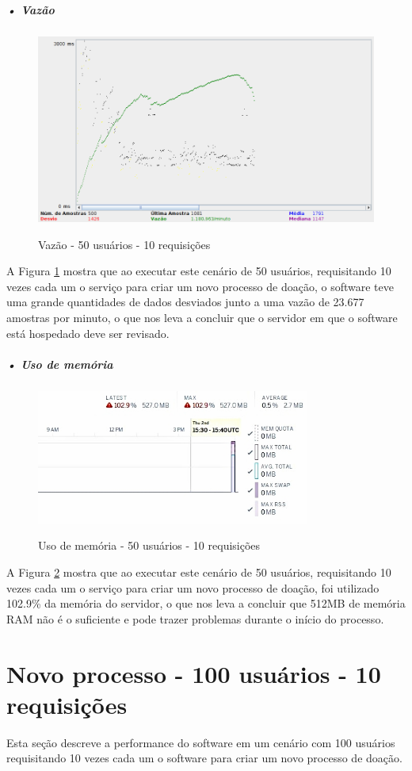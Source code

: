 \documentclass[portuguese,oneside]{tcc}
\begin{document}
\subparagraph{• Vazão}
\begin{figure}[htp]
\centering
\caption{Vazão - 50 usuários - 10 requisições}
\includegraphics[width=15cm]{50-10-throughput}
\label{fig:throughput-50-10}
\end{figure}

A Figura \ref{fig:throughput-50-10} mostra que ao executar este cenário de 50 usuários, requisitando 10 vezes cada um o serviço para criar um novo processo de doação, o software teve uma grande quantidades de dados desviados junto a uma vazão de 23.677 amostras por minuto, o que nos leva a concluir que o servidor em que o software está hospedado deve ser revisado.

\subparagraph{• Uso de memória}
\begin{figure}[htp]
\centering
\caption{Uso de memória - 50 usuários - 10 requisições}
\includegraphics[width=9cm]{50-10-memory}
\label{fig:uso-de-memoria-50-10}
\end{figure}

A Figura \ref{fig:uso-de-memoria-50-10} mostra que ao executar este cenário de 50 usuários, requisitando 10 vezes cada um o serviço para criar um novo processo de doação, foi utilizado 102.9\% da memória do servidor, o que nos leva a concluir que 512MB de memória RAM não é o suficiente e pode trazer problemas durante o início do processo.


\section{Novo processo - 100 usuários - 10 requisições}
Esta seção descreve a performance do software em um cenário com 100 usuários requisitando 10 vezes cada um o software para criar um novo processo de doação.
\end{document}
